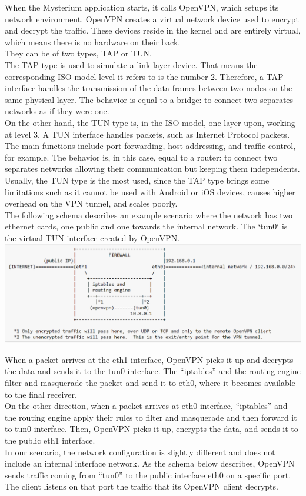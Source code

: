 \documentclass[]{article}
\begin{document}
	When the Mysterium application starts, it calls OpenVPN, which setups its network environment. OpenVPN creates a virtual network device used to encrypt and decrypt the traffic. These devices reside in the kernel and are entirely virtual, which means there is no hardware on their back.\\They can be of two types, TAP or TUN.\\
	The TAP type is used to simulate a link layer device. That means the corresponding ISO model level it refers to is the number 2. Therefore, a TAP interface handles the transmission of the data frames between two nodes on the same physical layer. The behavior is equal to a bridge: to connect two separates networks as if they were one.\\
	On the other hand, the TUN type is, in the ISO model, one layer upon, working at level 3. A TUN interface handles packets, such as Internet Protocol packets. The main functions include port forwarding, host addressing, and traffic control, for example. The behavior is, in this case, equal to a router: to connect two separates networks allowing their communication but keeping them independents.\\
	Usually, the TUN type is the most used, since the TAP type brings some limitations such as it cannot be used with Android or iOS devices, causes higher overhead on the VPN tunnel, and scales poorly.\\
	The following schema describes an example scenario where the network has two ethernet cards, one public and one towards the internal network. The `tun0` is the virtual TUN interface created by OpenVPN.\\

	\includegraphics[width=1\textwidth]{"images/openvpn_routing_setup.PNG"}

	When a packet arrives at the eth1 interface, OpenVPN picks it up and decrypts the data and sends it to the tun0 interface. The ``iptables'' and the routing engine filter and masquerade the packet and send it to eth0, where it becomes available to the final receiver.\\On the other direction, when a packet arrives at eth0 interface, ``iptables'' and the routing engine apply their rules to filter and masquerade and then forward it to tun0 interface. Then, OpenVPN picks it up, encrypts the data, and sends it to the public eth1 interface.\\
	In our scenario, the network configuration is slightly different and does not include an internal interface network. As the schema below describes, OpenVPN sends traffic coming from ``tun0'' to the public interface eth0 on a specific port. The client listens on that port the traffic that its OpenVPN client decrypts. \\
\end{document}
